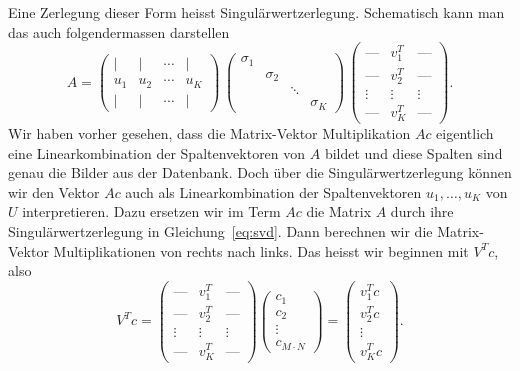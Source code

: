 Eine Zerlegung dieser Form heisst Singulärwertzerlegung.
Schematisch kann man das auch folgendermassen darstellen
\begin{equation}\label{eq:svd}
A=
\begin{pmatrix}
	\vert & \vert & \cdots & \vert \\
	u_1   & u_2   & \cdots & u_K \\
	\vert & \vert & \cdots & \vert
\end{pmatrix}
\,
\begin{pmatrix}
	\sigma_1 & & & \\
	& \sigma_2 & & \\
	& & \ddots & \\
	& & & \sigma_K
\end{pmatrix}
\,
\begin{pmatrix}
	\text{---} & v_1^T & \text{---} \\
	\text{---} & v_2^T & \text{---} \\
	\vdots & \vdots & \vdots \\
	\text{---} & v_K^T & \text{---}
\end{pmatrix}.
\end{equation}
Wir haben vorher gesehen, dass die Matrix-Vektor Multiplikation $Ac$ eigentlich eine Linearkombination der Spaltenvektoren von $A$ bildet und diese Spalten sind genau die Bilder aus der Datenbank.
Doch über die Singulärwertzerlegung können wir den Vektor $Ac$ auch als Linearkombination der Spaltenvektoren $u_1,\ldots,u_K$ von $U$ interpretieren.
Dazu ersetzen wir im Term $Ac$ die Matrix $A$ durch ihre Singulärwertzerlegung in Gleichung~\ref{eq:svd}.
Dann berechnen wir die Matrix-Vektor Multiplikationen von rechts nach links.
Das heisst wir beginnen mit $V^Tc$, also
\begin{equation*}
	V^Tc=
	\begin{pmatrix}
		\text{---} & v_1^T & \text{---} \\
		\text{---} & v_2^T & \text{---} \\
		\vdots & \vdots & \vdots \\
		\text{---} & v_K^T & \text{---}
	\end{pmatrix}
	\begin{pmatrix}
		c_1 \\
		c_2 \\
		\vdots \\
		c_{M\cdot N}
	\end{pmatrix}=
	\begin{pmatrix}
		v_1^T c \\
		v_2^T c \\
		\vdots \\
		v_K^T c
	\end{pmatrix}.
\end{equation*}
